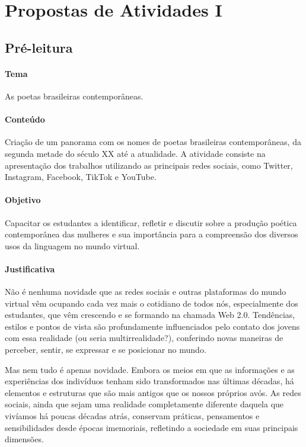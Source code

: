 \documentclass[12pt]{extarticle}
\begin{document}
	
\section{Propostas de Atividades I}


\subsection{Pré-leitura}

\paragraph{Tema} As poetas brasileiras contemporâneas.

\paragraph{Conteúdo} Criação de um panorama com os nomes de poetas
brasileiras contemporâneas, da segunda metade do século XX até a
atualidade. A atividade consiste na apresentação dos trabalhos
utilizando as principais redes sociais, como Twitter, Instagram,
Facebook, TikTok e YouTube.

\paragraph{Objetivo} Capacitar os estudantes a identificar, refletir e
discutir sobre a produção poética contemporânea das mulheres e sua
importância para a compreensão dos diversos usos da linguagem no mundo
virtual.

\paragraph{Justificativa} Não é nenhuma novidade que as redes sociais e
outras plataformas do mundo virtual vêm ocupando cada vez mais o
cotidiano de todos nós, especialmente dos estudantes, que vêm crescendo
e se formando na chamada Web 2.0. Tendências, estilos e pontos de vista
são profundamente influenciados pelo contato dos jovens com essa
realidade (ou seria multirrealidade?), conferindo novas maneiras de
perceber, sentir, se expressar e se posicionar no mundo.

Mas nem tudo é apenas novidade. Embora os meios em que as informações e
as experiências dos indivíduos tenham sido transformados nas últimas
décadas, há elementos e estruturas que são mais antigos que os nossos
próprios avós. As redes sociais, ainda que sejam uma realidade
completamente diferente daquela que vivíamos há poucas décadas atrás,
conservam práticas, pensamentos e sensibilidades desde épocas
imemoriais, refletindo a sociedade em suas principais dimensões.
\end{document}
